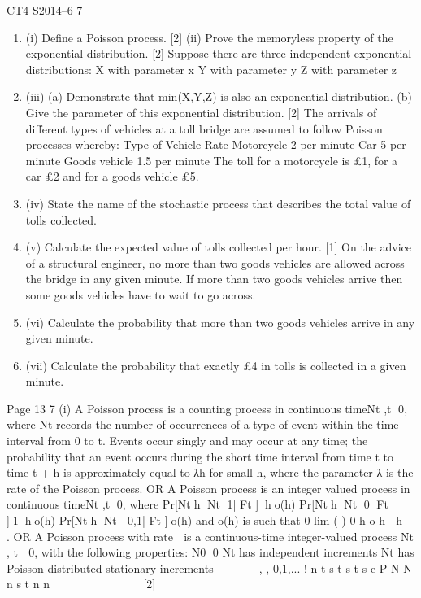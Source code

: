 \documentclass[a4paper,12pt]{article}
\begin{document}
CT4 S2014–6
7 
\begin{enumerate}
    \item (i) Define a Poisson process. [2]
\ite (ii) Prove the memoryless property of the exponential distribution. [2]
Suppose there are three independent exponential distributions:
  X with parameter x
Y with parameter y
Z with parameter z
\item (iii) (a) Demonstrate that min(X,Y,Z) is also an exponential distribution.
(b) Give the parameter of this exponential distribution. [2]
The arrivals of different types of vehicles at a toll bridge are assumed to follow
Poisson processes whereby:
  Type of Vehicle Rate
Motorcycle 2 per minute
Car 5 per minute
Goods vehicle 1.5 per minute
The toll for a motorcycle is £1, for a car £2 and for a goods vehicle £5.
\item (iv) State the name of the stochastic process that describes the total value of tolls
collected. 
\item (v) Calculate the expected value of tolls collected per hour. [1]
On the advice of a structural engineer, no more than two goods vehicles are allowed
across the bridge in any given minute. If more than two goods vehicles arrive then
some goods vehicles have to wait to go across.
\item (vi) Calculate the probability that more than two goods vehicles arrive in any given
minute. 
\item (vii) Calculate the probability that exactly £4 in tolls is collected in a given minute.
\end{enumerate}
\newpge
Page 13
7 (i) A Poisson process is a counting process in continuous time{Nt ,t 0}, where
Nt records the number of occurrences of a type of event within the time
interval from 0 to t.
Events occur singly and may occur at any time;
the probability that an event occurs during the short time interval from time t
to time t + h is approximately equal to λh for small h, where the parameter λ is
the rate of the Poisson process.
OR
A Poisson process is an integer valued process in continuous time{Nt ,t 0},
where
Pr[Nth Nt 1| Ft ]ho(h)
Pr[Nth Nt 0| Ft ]1ho(h)
Pr[Nth Nt  0,1| Ft ]o(h)
and o(h) is such that
0
lim ( ) 0
h
o h
 h
 .
OR
A Poisson process with rate  is a continuous-time integer-valued process
Nt , t  0, with the following properties:
  N0 0
Nt has independent increments
Nt has Poisson distributed stationary increments
     
, , 0,1,...
!
  n t s
t s
t s e
P N N n s t n
n
            [2]
\end{document}
